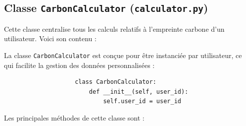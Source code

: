 \documentclass[a4paper,11pt]{article}
\begin{document}
        \subsection{Classe \texttt{CarbonCalculator} (\texttt{calculator.py})}
            \noindent Cette classe centralise tous les calculs relatifs à l'empreinte carbone d'un utilisateur. Voici son contenu :

            

            \noindent La classe \texttt{CarbonCalculator} est conçue pour être instanciée par utilisateur, ce qui facilite la gestion des données personnalisées :

            \begin{tcolorbox}[colback=lightgray!6, colframe=black, left=-35mm, right=5mm, top=2mm, bottom=0mm, boxrule=0.1mm]
                \begin{verbatim}
                    class CarbonCalculator:
                        def __init__(self, user_id):
                            self.user_id = user_id
                \end{verbatim}
            \end{tcolorbox}

            \noindent Les principales méthodes de cette classe sont :
\end{document}
